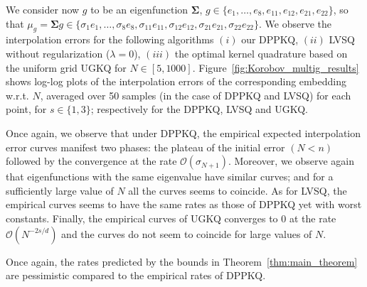 \documentclass[twoside,11pt]{book}
\numberwithin{theorem}{chapter}
\numberwithin{definition}{chapter}
\numberwithin{proposition}{chapter}
\numberwithin{corollary}{chapter}
\numberwithin{example}{chapter}
\numberwithin{lemma}{chapter}
\begin{document}
We consider now $g$ to be an eigenfunction $\bm{\Sigma}$, $g \in \{e_{1},\dots,e_{8},e_{11},e_{12},e_{21},e_{22}\}$, so that $\mu_{g} = \bm{\Sigma}g \in \{\sigma_{1}e_{1},\dots,\sigma_{8}e_{8},\sigma_{11}e_{11},\sigma_{12}e_{12},\sigma_{21}e_{21},\sigma_{22}e_{22}\}$. We observe the interpolation errors for the following algorithms $(i)$ our DPPKQ, $(ii)$ LVSQ without regularization ($\lambda =0$), $(iii)$ the optimal kernel quadrature based on the uniform grid UGKQ for $N \in [5,1000]$. Figure~\ref{fig:Korobov_multig_results} shows log-log plots of the interpolation errors of the corresponding embedding  w.r.t. $N$, averaged over 50 samples (in the case of DPPKQ and LVSQ) for each point, for $s \in \{1,3\}$; respectively for the DPPKQ, LVSQ and UGKQ.

Once again, we observe that under DPPKQ, the empirical expected interpolation error  curves manifest two phases: the plateau of the initial error $(N<n)$ followed by the convergence at the rate $\mathcal{O}(\sigma_{N+1})$. Moreover, we observe again that eigenfunctions with the same eigenvalue have similar curves; and for a sufficiently large value of $N$ all the curves seems to coincide. As for LVSQ, the empirical curves seems to have the same rates as those of DPPKQ yet with worst constants. Finally, the empirical curves of UGKQ converges to $0$ at the rate $\mathcal{O}(N^{-2s/d})$ and the curves do not seem to coincide for large values of $N$.

Once again, the rates predicted by the bounds in Theorem~\ref{thm:main_theorem} are pessimistic compared to the empirical rates of DPPKQ. 
\end{document}
